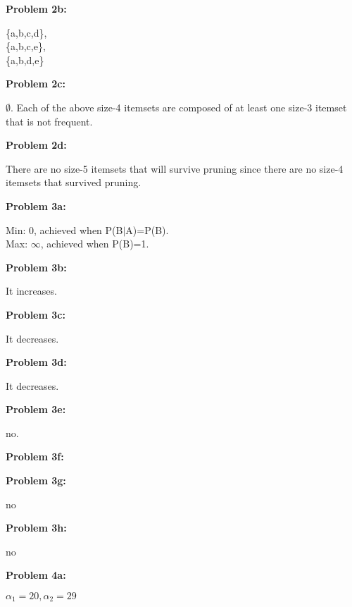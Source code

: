 \documentclass[11pt]{article}
\numberwithin{equation}{section}  %
\begin{document}
\noindent\textbf{Problem 2b: }

\noindent\{a,b,c,d\},\\
\{a,b,c,e\},\\
\{a,b,d,e\}
\vspace*{0.25in}

\noindent\textbf{Problem 2c: }

\noindent $\emptyset$. Each of the above size-4 itemsets are composed of at least one size-3 itemset that is not frequent.
\vspace*{0.25in}

\noindent\textbf{Problem 2d: }

\noindent There are no size-5 itemsets that will survive pruning since there are no size-4 itemsets that survived pruning.
\vspace*{0.25in}

\noindent\textbf{Problem 3a: }

\noindent Min: 0, achieved when P(B$|$A)=P(B).\\
Max: $\infty$, achieved when P(B)=1.
\vspace*{0.25in}

\noindent\textbf{Problem 3b: }

\noindent It increases.
\vspace*{0.25in}

\noindent\textbf{Problem 3c: }

\noindent It decreases.
\vspace*{0.25in}

\noindent\textbf{Problem 3d: }

\noindent It decreases.
\vspace*{0.25in}

\noindent\textbf{Problem 3e: }

\noindent no.
\vspace*{0.25in}

\noindent\textbf{Problem 3f: }

\vspace*{0.25in}

\noindent\textbf{Problem 3g: }

\noindent no
\vspace*{0.25in}

\noindent\textbf{Problem 3h: }

\noindent no
\vspace*{0.25in}

\noindent\textbf{Problem 4a: }

\noindent $\alpha_1=20,\alpha_2=29$
\vspace*{0.25in}
\end{document}
